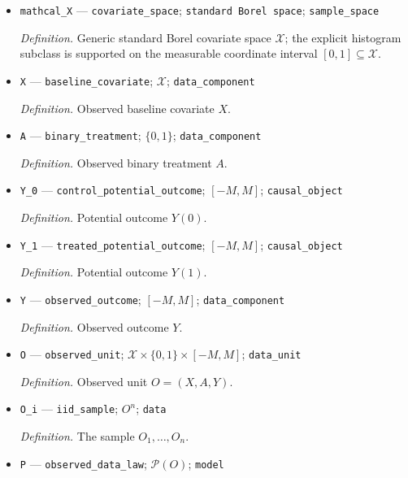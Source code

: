 \documentclass{article}
\begin{document}
\begin{itemize}
  \par\smallskip\noindent\emph{Definition.} Prespecified noncoverage level \(\gamma\).
  \item \texttt{mathcal\_\allowbreak{}X} --- \texttt{covariate\_\allowbreak{}space}; \texttt{standard Borel space}; \texttt{sample\_\allowbreak{}space}
  \par\smallskip\noindent\emph{Definition.} Generic standard Borel covariate space \(\mathcal X\); the explicit histogram subclass is supported on the measurable coordinate interval \([0,1]\subseteq\mathcal X\).
  \item \texttt{X} --- \texttt{baseline\_\allowbreak{}covariate}; \(\mathcal X\); \texttt{data\_\allowbreak{}component}
  \par\smallskip\noindent\emph{Definition.} Observed baseline covariate \(X\).
  \item \texttt{A} --- \texttt{binary\_\allowbreak{}treatment}; \(\{0,1\}\); \texttt{data\_\allowbreak{}component}
  \par\smallskip\noindent\emph{Definition.} Observed binary treatment \(A\).
  \item \texttt{Y\_\allowbreak{}0} --- \texttt{control\_\allowbreak{}potential\_\allowbreak{}outcome}; \([-M,M]\); \texttt{causal\_\allowbreak{}object}
  \par\smallskip\noindent\emph{Definition.} Potential outcome \(Y(0)\).
  \item \texttt{Y\_\allowbreak{}1} --- \texttt{treated\_\allowbreak{}potential\_\allowbreak{}outcome}; \([-M,M]\); \texttt{causal\_\allowbreak{}object}
  \par\smallskip\noindent\emph{Definition.} Potential outcome \(Y(1)\).
  \item \texttt{Y} --- \texttt{observed\_\allowbreak{}outcome}; \([-M,M]\); \texttt{data\_\allowbreak{}component}
  \par\smallskip\noindent\emph{Definition.} Observed outcome \(Y\).
  \item \texttt{O} --- \texttt{observed\_\allowbreak{}unit}; \(\mathcal X\times\{0,1\}\times[-M,M]\); \texttt{data\_\allowbreak{}unit}
  \par\smallskip\noindent\emph{Definition.} Observed unit \(O=(X,A,Y)\).
  \item \texttt{O\_\allowbreak{}i} --- \texttt{iid\_\allowbreak{}sample}; \(O^n\); \texttt{data}
  \par\smallskip\noindent\emph{Definition.} The sample \(O_1,\ldots,O_n\).
  \item \texttt{P} --- \texttt{observed\_\allowbreak{}data\_\allowbreak{}law}; \(\mathcal P(O)\); \texttt{model}

\end{itemize}
\end{document}

